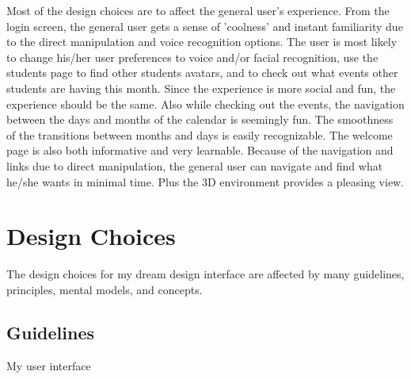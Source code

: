 \documentclass{article}
\begin{document}
Most of the design choices are to affect the general user's experience.  From the login screen, the general user gets a sense of 'coolness' and instant familiarity due to the direct manipulation and voice recognition options.  The user is most likely to change his/her user preferences to voice and/or facial recognition, use the students page to find other students avatars, and to check out what events other students are having this month.  Since the experience is more social and fun, the experience should be the same.  Also while checking out the events, the navigation between the days and months of the calendar is seemingly fun.  The smoothness of the transitions between months and days is easily recognizable.  The welcome page is also both informative and very learnable.  Because of the navigation and links due to direct manipulation, the general user can navigate and find what he/she wants in minimal time.  Plus the 3D environment provides a pleasing view.

\section{Design Choices}

The design choices for my dream design interface are affected by many guidelines, principles, mental models, and concepts.

\subsection{Guidelines}

My user interface





\end{document}
